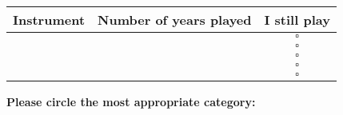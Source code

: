 \documentclass[12pt, a4paper]{article}
\begin{document}
\vspace{8pt}

\begin{tabular}{|m{5cm}|l|c|}
\hline 
\textbf{Instrument} & \textbf{Number of years played} & \textbf{I still play}\\ \hline
 & & $\square$ \\[5pt] \hline
 & & $\square$ \\[5pt] \hline
 & & $\square$ \\[5pt] \hline
 & & $\square$ \\[5pt] \hline
 & & $\square$ \\[5pt] \hline
\end{tabular}

\vspace{8pt}

\textbf{Please circle the most appropriate category:}
\end{document}
